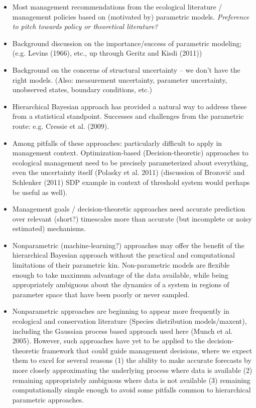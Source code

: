 \documentclass[author-year, review]{elsarticle} %
\begin{document}
\begin{itemize}
\item
  Most management recommendations from the ecological literature /
  management policies based on (motivated by) parametric models.
  \emph{Preference to pitch towards policy or theoretical literature?}
\item
  Background discussion on the importance/success of parametric
  modeling; (e.g. Levins (1966), etc., up through Geritz and Kisdi
  (2011))
\item
  Background on the concerns of structural uncertainty -- we don't have
  the right models. (Also: measurement uncertainty, parameter
  uncertainty, unobserved states, boundary conditions, etc.)
\item
  Hierarchical Bayesian approach has provided a natural way to address
  these from a statistical standpoint. Successes and challenges from the
  parametric route: e.g. Cressie et al. (2009).
\item
  Among pitfalls of these approaches: particularly difficult to apply in
  management context. Optimization-based (Decision-theoretic) approaches
  to ecological management need to be precisely parameterized about
  everything, even the uncertainty itself (Polasky et al. 2011)
  (discussion of Brozović and Schlenker (2011) SDP example in context of
  threshold system would perhaps be useful as well).
\item
  Management goals / decision-theoretic approaches need accurate
  prediction over relevant (short?) timescales more than accurate (but
  incomplete or noisy estimated) mechanisms.
\item
  Nonparametric (machine-learning?) approaches may offer the benefit of
  the hierarchical Bayesian approach without the practical and
  computational limitations of their parametric kin. Non-parametric
  models are flexible enough to take maximum advantage of the data
  available, while being appropriately ambiguous about the dynamics of a
  system in regions of parameter space that have been poorly or never
  sampled.
\item
  Nonparametric approaches are beginning to appear more frequently in
  ecological and conservation literature (Species distribution
  models/maxent), including the Gaussian process based approach used
  here (Munch et al. 2005). However, such approaches have yet to be
  applied to the decision-theoretic framework that could guide
  management decisions, where we expect them to excel for several
  reasons (1) the ability to make accurate forecasts by more closely
  approximating the underlying process where data is available (2)
  remaining appropriately ambiguous where data is not available (3)
  remaining computationally simple enough to avoid some pitfalls common
  to hierarchical parametric approaches.
\end{itemize}
\end{document}
